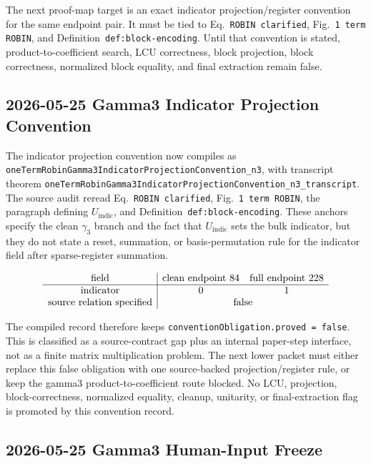 The next proof-map target is an exact indicator projection/register convention
for the same endpoint pair.  It must be tied to Eq.~\texttt{ROBIN clarified},
Fig.~\texttt{1 term ROBIN}, and Definition~\texttt{def:block-encoding}.  Until
that convention is stated, product-to-coefficient search, LCU correctness,
block projection, block correctness, normalized block equality, and final
extraction remain false.

\subsection{2026-05-25 Gamma3 Indicator Projection Convention}

The indicator projection convention now compiles as
\texttt{oneTermRobinGamma3IndicatorProjectionConvention\_n3}, with transcript
theorem
\texttt{oneTermRobinGamma3IndicatorProjectionConvention\_n3\_transcript}.
The source audit reread Eq.~\texttt{ROBIN clarified},
Fig.~\texttt{1 term ROBIN}, the paragraph defining
$U_{\mathrm{indic}}$, and Definition~\texttt{def:block-encoding}.  These
anchors specify the clean $\gamma_3$ branch and the fact that
$U_{\mathrm{indic}}$ sets the bulk indicator, but they do not state a reset,
summation, or basis-permutation rule for the indicator field after
sparse-register summation.

\[
\begin{array}{c|cc}
\text{field} & \text{clean endpoint }84 & \text{full endpoint }228 \\
\hline
\text{indicator} & 0 & 1 \\
\text{source relation specified} & \multicolumn{2}{c}{\text{false}} \\
\end{array}
\]

The compiled record therefore keeps
\texttt{conventionObligation.proved = false}.  This is classified as a
source-contract gap plus an internal paper-step interface, not as a finite
matrix multiplication problem.  The next lower packet must either replace this
false obligation with one source-backed projection/register rule, or keep the
gamma3 product-to-coefficient route blocked.  No LCU, projection,
block-correctness, normalized equality, cleanup, unitarity, or final-extraction
flag is promoted by this convention record.

\subsection{2026-05-25 Gamma3 Human-Input Freeze}

